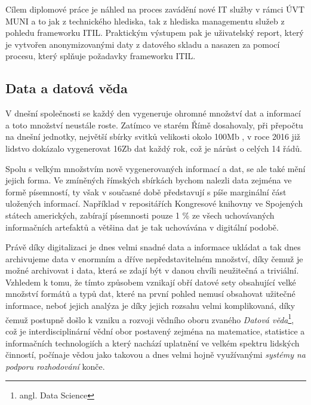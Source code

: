 \documentclass[
  digital,     %
  twoside,     %
  lof,         %
  lot,         %
]{fithesis4}
\begin{document}
Cílem diplomové práce je náhled na proces zavádění nové IT služby v rámci ÚVT MUNI a to jak z technického hlediska, tak z hlediska managementu služeb z pohledu frameworku ITIL. Praktickým výstupem pak je uživatelský report, který je vytvořen anonymizovanými daty z datového skladu a nasazen za pomocí procesu, který splňuje požadavky frameworku ITIL.

\subsection{Data a datová věda}
V dnešní společnosti se každý den vygeneruje ohromné množství dat a informací a
toto množství neustále roste. Zatímco ve starém Římě dosahovaly, při přepočtu na dnešní
jednotky, největší sbírky svitků velikosti okolo 100Mb \parencite[p.~157]{Smil2021}, v roce 2016 již
lidstvo dokázalo vygenerovat 16Zb dat každý rok\parencite[p.~160]{Smil2021}, což je nárůst
o celých 14 řádů.

Spolu s velkým množstvím nově vygenerovaných informací a dat, se ale také mění jejich
forma. Ve zmíněných římských sbírkách bychom nalezli data zejména ve formě písemností, ty však v současné době představují s
píše marginální část uložených informací. Například v repositářích Kongresové knihovny ve Spojených státech amerických, zabírají písemnosti
pouze 1 \% ze všech uchovávaných informačních artefaktů \parencite[p.~158]{Smil2021} a většina dat je tak uchovávána v digitální podobě.

Právě díky digitalizaci je dnes velmi snadné data a informace ukládat a tak dnes archivujeme data v enormním a dříve nepředstavitelném množství, díky čemuž je možné archivovat i data, která se zdají být v danou chvíli neužitečná a triviální. Vzhledem k tomu, že tímto způsobem vznikají obří datové sety obsahující velké množství formátů a typů dat, které na první pohled nemusí obsahovat užitečné informace, neboť jejich analýza je díky jejich rozsahu velmi komplikovaná, díky čemuž postupně došlo k vzniku a rozvoji vědního oboru zvaného \emph{Datová věda}\footnote{angl. Data Science}, což je interdisciplinární vědní obor postavený zejména na matematice, statistice a informačních technologiích a který nachází uplatnění ve velkém spektru lidských činností, počínaje vědou jako takovou a dnes velmi hojně využívanými \emph{systémy na podporu rozhodování} konče.
\end{document}
